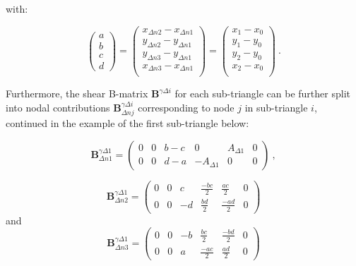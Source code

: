 with:

\begin{equation} 
\begin{pmatrix}
a \\
b \\
c \\
d
\end{pmatrix}
=
\begin{pmatrix}
x_{\Delta n2} - x_{\Delta n1} \\
y_{\Delta n2} - y_{\Delta n1} \\
y_{\Delta n3} - y_{\Delta n1} \\
x_{\Delta n3} - x_{\Delta n1} \\
\end{pmatrix}
=
\begin{pmatrix}
x_{1} - x_{0} \\
y_{1} - y_{0} \\
y_{2} - y_{0} \\
x_{2} - x_{0} \\
\end{pmatrix}
\label{eqCSDSG3_0}\ .
\end{equation}

 Furthermore, the shear B-matrix $\mathbf{B}^{\gamma\Delta i}$ for each sub-triangle can be further split into nodal contributions $\mathbf{B}_{\Delta nj}^{\gamma\Delta i}$ corresponding to node $j$ in sub-triangle $i$, continued in the example of the first sub-triangle below:
 
\begin{equation} 
\mathbf{B}_{\Delta n1}^{\gamma\Delta 1}
 =
\begin{pmatrix}
 0 & 0 & b-c & 0 & A_{\Delta 1} & 0 \\
 0 & 0 & d-a & -A_{\Delta 1} & 0 & 0 
\end{pmatrix}
 \label{eqCSDSG4}\ ,
 \end{equation}
 
  \begin{equation} 
\mathbf{B}_{\Delta n2}^{\gamma\Delta 1}
=
\begin{pmatrix}
0 & 0 & c & \frac{-bc}{2} & \frac{ac}{2} & 0 \\
0 & 0 & -d & \frac{bd}{2} & \frac{-ad}{2} & 0
\end{pmatrix}
\label{eqCSDSG5}
\end{equation}
and
  \begin{equation} 
\mathbf{B}_{\Delta n3}^{\gamma\Delta 1}
=
\begin{pmatrix}
0 & 0 & -b & \frac{bc}{2} & \frac{-bd}{2} & 0 \\
0 & 0 & a & \frac{-ac}{2} & \frac{ad}{2} & 0
\end{pmatrix}
\label{eqCSDSG6}
\end{equation}


